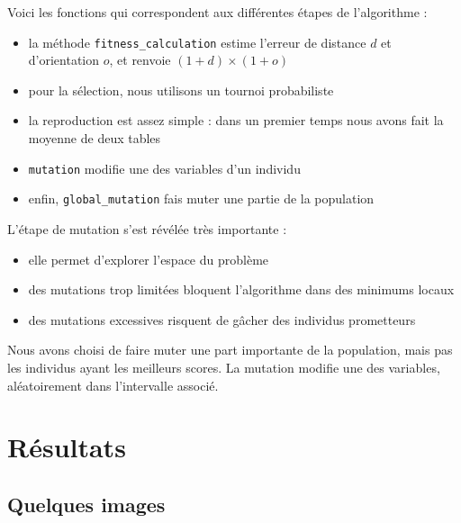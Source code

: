 \documentclass[graphics]{beamer}
\begin{document}
\begin{frame}
	Voici les fonctions qui correspondent aux différentes étapes de l'algorithme :
	\begin{itemize}
		\item la méthode \texttt{fitness_calculation} estime l'erreur de distance $d$ et d'orientation $o$, et renvoie $(1+d) \times (1+o)$
		\item pour la sélection, nous utilisons un tournoi probabiliste
		\item la reproduction est assez simple : dans un premier temps nous avons fait la moyenne de deux tables
		\item \texttt{mutation} modifie une des variables d'un individu 
		\item enfin, \texttt{global_mutation} fais muter une partie de la population 
	\end{itemize}
\end{frame}

\begin{frame}
	L'étape de mutation s'est révélée très importante :
	\begin{itemize}
		\item elle permet d'explorer l'espace du problème 
		\item des mutations trop limitées bloquent l'algorithme dans des minimums locaux
		\item des mutations excessives risquent de gâcher des individus prometteurs
	\end{itemize}
Nous avons choisi de faire muter une part importante de la population, mais pas les individus ayant les meilleurs scores. La mutation modifie une des variables, aléatoirement dans l'intervalle associé.
\end{frame}

\section{Résultats}
\subsection{Quelques images}
\end{document}
